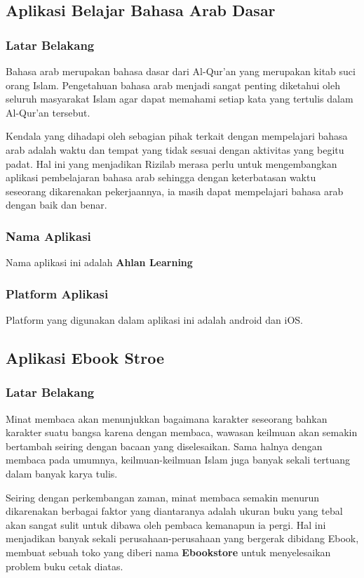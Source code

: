 \documentclass[Rizilab.tex]{subfile}
\begin{document}
  \subsection{Aplikasi Belajar Bahasa Arab Dasar}
   \subsubsection{Latar Belakang}
    Bahasa arab merupakan bahasa dasar dari Al-Qur'an yang merupakan kitab suci orang Islam. Pengetahuan bahasa arab menjadi sangat penting diketahui oleh seluruh masyarakat Islam agar dapat memahami setiap kata yang tertulis dalam Al-Qur'an tersebut.

    Kendala yang dihadapi oleh sebagian pihak terkait dengan mempelajari bahasa arab adalah waktu dan tempat yang tidak sesuai dengan aktivitas yang begitu padat. Hal ini yang menjadikan Rizilab merasa perlu untuk mengembangkan aplikasi pembelajaran bahasa arab sehingga dengan keterbatasan waktu seseorang dikarenakan pekerjaannya, ia masih dapat mempelajari bahasa arab dengan baik dan benar.
   \subsubsection{Nama Aplikasi}
    Nama aplikasi ini adalah {\bfseries Ahlan Learning}
   \subsubsection{Platform Aplikasi}
    Platform yang digunakan dalam aplikasi ini adalah android dan iOS.

  \subsection{Aplikasi Ebook Stroe}
   \subsubsection{Latar Belakang}
    Minat membaca akan menunjukkan bagaimana karakter seseorang bahkan karakter suatu bangsa karena dengan membaca, wawasan keilmuan akan semakin bertambah seiring dengan bacaan yang diselesaikan. Sama halnya dengan membaca pada umumnya, keilmuan-keilmuan Islam juga banyak sekali tertuang dalam banyak karya tulis.

    Seiring dengan perkembangan zaman, minat membaca semakin menurun dikarenakan berbagai faktor yang diantaranya adalah ukuran buku yang tebal akan sangat sulit untuk dibawa oleh pembaca kemanapun ia pergi. Hal ini menjadikan banyak sekali perusahaan-perusahaan yang bergerak dibidang Ebook, membuat sebuah toko yang diberi nama {\bfseries Ebookstore} untuk menyelesaikan problem buku cetak diatas.
\end{document}
